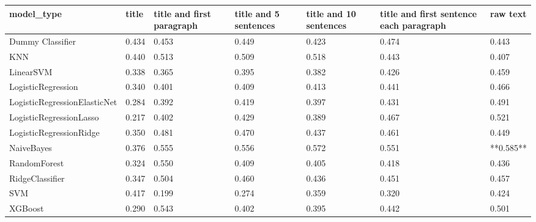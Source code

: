 \begin{tabular}{lllllll}
\toprule
                  model\_type & title & title and first paragraph & title and 5 sentences & title and 10 sentences & title and first sentence each paragraph &  raw text \\
\midrule
            Dummy Classifier & 0.434 &                     0.453 &                 0.449 &                  0.423 &                                   0.474 &     0.443 \\
                         KNN & 0.440 &                     0.513 &                 0.509 &                  0.518 &                                   0.443 &     0.407 \\
                   LinearSVM & 0.338 &                     0.365 &                 0.395 &                  0.382 &                                   0.426 &     0.459 \\
          LogisticRegression & 0.340 &                     0.401 &                 0.409 &                  0.413 &                                   0.441 &     0.466 \\
LogisticRegressionElasticNet & 0.284 &                     0.392 &                 0.419 &                  0.397 &                                   0.431 &     0.491 \\
     LogisticRegressionLasso & 0.217 &                     0.402 &                 0.429 &                  0.389 &                                   0.467 &     0.521 \\
     LogisticRegressionRidge & 0.350 &                     0.481 &                 0.470 &                  0.437 &                                   0.461 &     0.449 \\
                  NaiveBayes & 0.376 &                     0.555 &                 0.556 &                  0.572 &                                   0.551 & **0.585** \\
                RandomForest & 0.324 &                     0.550 &                 0.409 &                  0.405 &                                   0.418 &     0.436 \\
             RidgeClassifier & 0.347 &                     0.504 &                 0.460 &                  0.436 &                                   0.451 &     0.457 \\
                         SVM & 0.417 &                     0.199 &                 0.274 &                  0.359 &                                   0.320 &     0.424 \\
                     XGBoost & 0.290 &                     0.543 &                 0.402 &                  0.395 &                                   0.442 &     0.501 \\
\bottomrule
\end{tabular}
